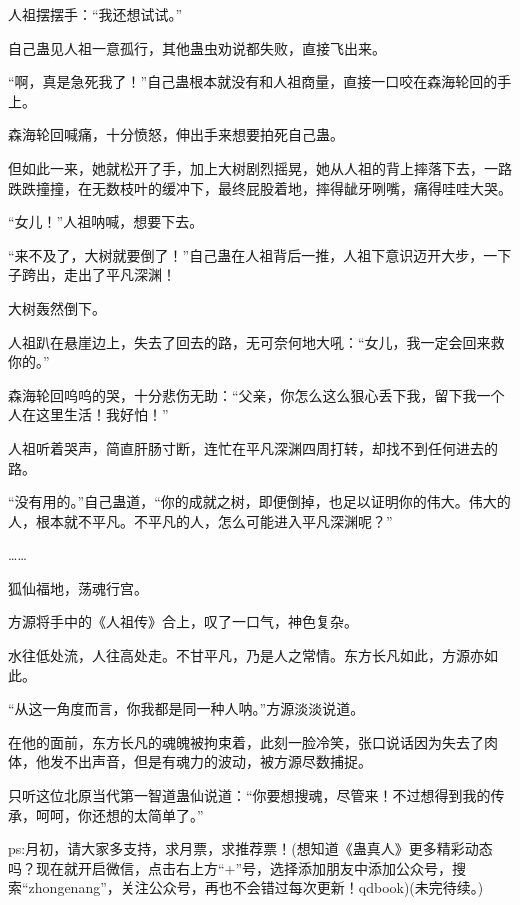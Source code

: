 \begin{this_body}
人祖摆摆手：“我还想试试。”

自己蛊见人祖一意孤行，其他蛊虫劝说都失败，直接飞出来。

“啊，真是急死我了！”自己蛊根本就没有和人祖商量，直接一口咬在森海轮回的手上。

森海轮回喊痛，十分愤怒，伸出手来想要拍死自己蛊。

但如此一来，她就松开了手，加上大树剧烈摇晃，她从人祖的背上摔落下去，一路跌跌撞撞，在无数枝叶的缓冲下，最终屁股着地，摔得龇牙咧嘴，痛得哇哇大哭。

“女儿！”人祖呐喊，想要下去。

“来不及了，大树就要倒了！”自己蛊在人祖背后一推，人祖下意识迈开大步，一下子跨出，走出了平凡深渊！

大树轰然倒下。

人祖趴在悬崖边上，失去了回去的路，无可奈何地大吼：“女儿，我一定会回来救你的。”

森海轮回呜呜的哭，十分悲伤无助：“父亲，你怎么这么狠心丢下我，留下我一个人在这里生活！我好怕！”

人祖听着哭声，简直肝肠寸断，连忙在平凡深渊四周打转，却找不到任何进去的路。

“没有用的。”自己蛊道，“你的成就之树，即便倒掉，也足以证明你的伟大。伟大的人，根本就不平凡。不平凡的人，怎么可能进入平凡深渊呢？”

……

狐仙福地，荡魂行宫。

方源将手中的《人祖传》合上，叹了一口气，神色复杂。

水往低处流，人往高处走。不甘平凡，乃是人之常情。东方长凡如此，方源亦如此。

“从这一角度而言，你我都是同一种人呐。”方源淡淡说道。

在他的面前，东方长凡的魂魄被拘束着，此刻一脸冷笑，张口说话因为失去了肉体，他发不出声音，但是有魂力的波动，被方源尽数捕捉。

只听这位北原当代第一智道蛊仙说道：“你要想搜魂，尽管来！不过想得到我的传承，呵呵，你还想的太简单了。”

ps:月初，请大家多支持，求月票，求推荐票！(想知道《蛊真人》更多精彩动态吗？现在就开启微信，点击右上方“+”号，选择添加朋友中添加公众号，搜索“zhongenang”，关注公众号，再也不会错过每次更新！qdbook)(未完待续。)

\end{this_body}

